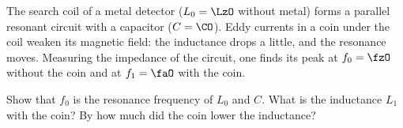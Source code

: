 The search coil of a metal detector ($L_0 = \LzO$ without metal) forms a parallel resonant circuit with a capacitor ($C = \CO$). Eddy currents in a coin under the coil weaken its magnetic field: the inductance drops a little, and the resonance moves. Measuring the impedance of the circuit, one finds its peak at $f_0 = \fzO$ without the coin and at $f_1 = \faO$ with the coin.

\begin{abcliste}
\abc Show that $f_0$ is the resonance frequency of $L_0$ and $C$.
\abc What is the inductance $L_1$ with the coin?
\abc By how much did the coin lower the inductance?
\end{abcliste}
